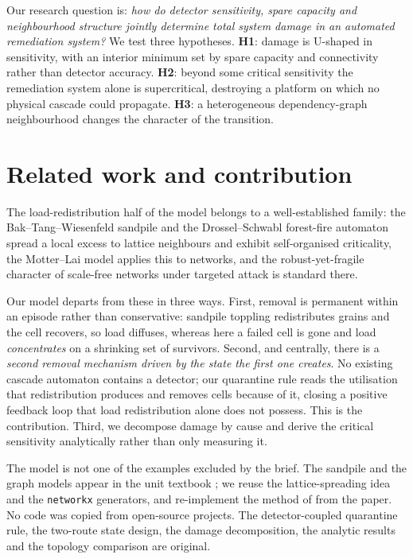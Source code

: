 \documentclass[11pt,a4paper]{article}
\begin{document}
Our research question is: \emph{how do detector sensitivity, spare capacity and
neighbourhood structure jointly determine total system damage in an automated
remediation system?} We test three hypotheses. \textbf{H1}: damage is U-shaped
in sensitivity, with an interior minimum set by spare capacity and connectivity
rather than detector accuracy. \textbf{H2}: beyond some critical sensitivity
the remediation system alone is supercritical, destroying a platform on which no
physical cascade could propagate. \textbf{H3}: a heterogeneous dependency-graph
neighbourhood changes the character of the transition.

\section{Related work and contribution}

The load-redistribution half of the model belongs to a well-established family:
the Bak--Tang--Wiesenfeld sandpile \citep{bak1987} and the Drossel--Schwabl
forest-fire automaton \citep{drossel1992} spread a local excess to lattice
neighbours and exhibit self-organised criticality, the Motter--Lai model
\citep{motter2002} applies this to networks, and the robust-yet-fragile
character of scale-free networks under targeted attack \citep{albert2000} is
standard there.

Our model departs from these in three ways. First, removal is permanent within
an episode rather than conservative: sandpile toppling redistributes grains and
the cell recovers, so load diffuses, whereas here a failed cell is gone and load
\emph{concentrates} on a shrinking set of survivors. Second, and centrally,
there is a \emph{second removal mechanism driven by the state the first one
creates}. No existing cascade automaton contains a detector; our quarantine rule
reads the utilisation that redistribution produces and removes cells because of
it, closing a positive feedback loop that load redistribution alone does not
possess. This is the contribution. Third, we decompose damage by cause and
derive the critical sensitivity analytically rather than only measuring it.

The model is not one of the examples excluded by the brief. The sandpile and the
graph models appear in the unit textbook \citep{downey2018}; we reuse the
lattice-spreading idea and the \texttt{networkx} generators, and re-implement
the method of \citet{clauset2009} from the paper. No code was copied from
open-source projects. The detector-coupled quarantine rule, the two-route state
design, the damage decomposition, the analytic results and the topology
comparison are original.
\end{document}
